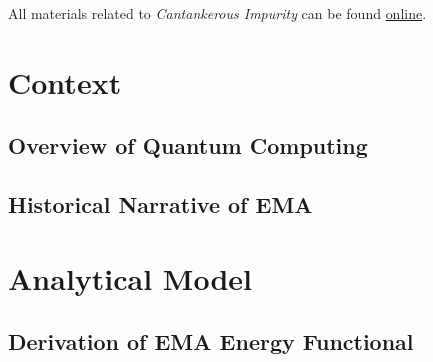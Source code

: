 \documentclass[12pt]{report}
\begin{document}
All materials related to \emph{Cantankerous Impurity} can be found
\href{https://gitlab.com/cantankerous-impurity/}{online}.

\tableofcontents

\chapter{Context}
\addtocounter{page}{7}

    \section{Overview of Quantum Computing}
        
        
    \section{Historical Narrative of EMA}
        
        
        
        
        

\chapter{Analytical Model}
\label{AnalyticalModel}
    \section{Derivation of EMA Energy Functional}
        
        
        
        
        
        
        
        
        
        
\end{document}
